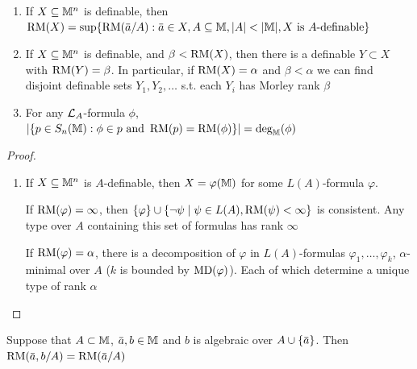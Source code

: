 \documentclass[11pt]{article}
\begin{document}
\begin{lemma}[]
\label{Problem11}
\label{lemma6.2.16}
\begin{enumerate}
\item If \(X\subseteq\mathbb{M}^n\) is definable,
then \(\RM(X)=\sup\{\RM(\bara/A):\bara\in X,A\subseteq\M,\abs{A}<\abs{\M},X\text{ is }A\text{-definable}\}\)
\item If \(X\subseteq\mathbb{M}^n\) is definable, and \(\beta<\operatorname{RM}(X)\), then there is a definable \(Y\subset X\)
with \(\operatorname{RM}(Y)=\beta\). In particular, if \(\operatorname{RM}(X)=\alpha\) and \(\beta<\alpha\) we can find disjoint definable
sets \(Y_1,Y_2,\dots\) s.t. each \(Y_i\) has Morley rank \(\beta\)
\item For any \(\mathcal{L}_A\)-formula \(\phi\), \(\abs{\{p\in S_n(\M):\phi\in p\text{ and }\RM(p)=\RM(\phi)\}}=\deg_{\M}(\phi)\)
\end{enumerate}
\end{lemma}


\begin{proof}
\begin{enumerate}
\item If \(X\subseteq\mathbb{M}^n\) is \(A\)-definable, then \(X=\varphi(\mathbb{M})\) for some \(L(A)\)-formula \(\varphi\).

If \(\operatorname{RM}(\varphi)=\infty\), then \(\{\varphi\}\cup\{\neg\psi\mid\psi\in L(A),\operatorname{RM}(\psi)<\infty\}\) is consistent. Any type over \(A\)
containing this set of formulas has rank \(\infty\)

If \(\operatorname{RM}(\varphi)=\alpha\), there is a decomposition of \(\varphi\) in \(L(A)\)-formulas \(\varphi_1,\dots,\varphi_k\), \(\alpha\)-minimal
over \(A\) (\(k\) is bounded by \(\operatorname{MD}(\varphi)\)). Each of which determine a unique type of rank \(\alpha\)
\end{enumerate}
\end{proof}

\begin{lemma}[]
\label{lemma6.2.17}
Suppose that \(A\subset\mathbb{M}\), \(\bara,b\in\M\) and \(b\) is algebraic over \(A\cup\{\bara\}\). Then \(\RM(\bara,b/A)=\RM(\bara/A)\)
\end{lemma}
\end{document}
